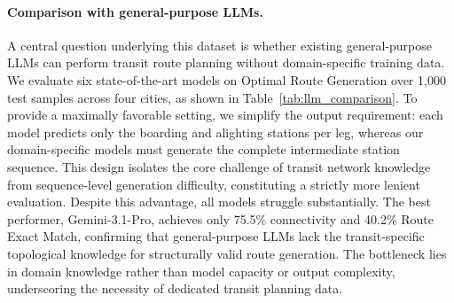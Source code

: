 \documentclass{article}
\begin{document}
\paragraph{Comparison with general-purpose LLMs.}
A central question underlying this dataset is whether existing general-purpose LLMs can perform transit route planning without domain-specific training data. We evaluate six state-of-the-art models on Optimal Route Generation over 1{,}000 test samples across four cities, as shown in Table~\ref{tab:llm_comparison}. To provide a maximally favorable setting, we simplify the output requirement: each model predicts only the boarding and alighting stations per leg, whereas our domain-specific models must generate the complete intermediate station sequence. This design isolates the core challenge of transit network knowledge from sequence-level generation difficulty, constituting a strictly more lenient evaluation. Despite this advantage, all models struggle substantially. The best performer, Gemini-3.1-Pro, achieves only 75.5\% connectivity and 40.2\% Route Exact Match, confirming that general-purpose LLMs lack the transit-specific topological knowledge for structurally valid route generation. The bottleneck lies in domain knowledge rather than model capacity or output complexity, underscoring the necessity of dedicated transit planning data.
\end{document}
